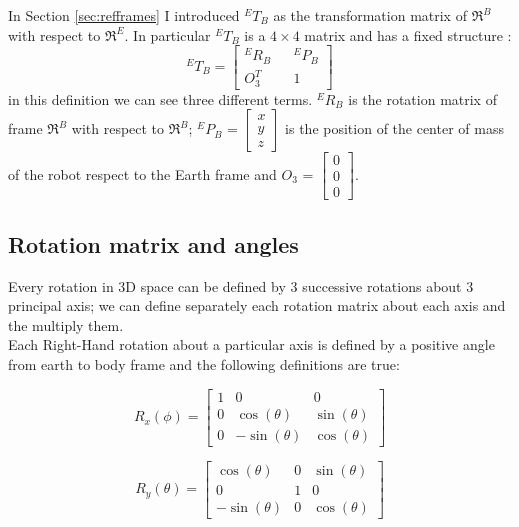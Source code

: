 \noindent
In Section \ref{sec:refframes} I introduced ${}^ET_B$ as the transformation matrix of $\Re^B$ with respect to $\Re^E$. In particular ${}^ET_B$ is a $4\times4$ matrix and has a fixed structure \cite{Khalil2004}: \begin{equation}
{}^ET_B = \begin{bmatrix}
{}^ER_B&&{}^EP_B\\
O_3^T&&1
\end{bmatrix}
\label{eq:transdef}
\end{equation}
in this definition we can see three different terms. ${}^ER_B$ is the rotation matrix of frame $\Re^B$ with respect to $\Re^B$; ${}^EP_B$ = $\begin{bmatrix}x\\y\\z\end{bmatrix}$ is the position of the center of mass of the robot respect to the Earth frame and $O_3$ = $\begin{bmatrix}0\\0\\0\end{bmatrix}$. 

\subsection*{Rotation matrix and angles}

Every rotation in 3D space can be defined by 3 successive rotations about 3 principal axis; we can define separately each rotation matrix about each axis and the multiply them.\\ 

\noindent
Each Right-Hand rotation about a particular axis is defined by a positive angle \cite{Blanco2010} from earth to body frame and the following definitions are true:

\begin{equation}
R_x(\phi) = \begin{bmatrix} 1 & 0            & 0 \\
							  0 & \cos(\theta) & \sin(\theta)\\
                              0 & -\sin(\theta) &  \cos(\theta) 
\end{bmatrix}
\end{equation}

\begin{equation}
R_y(\theta) = \begin{bmatrix} \cos(\theta)  & 0 & \sin(\theta) \\
							  0 & 		      1 &   0\\
                              -\sin(\theta) &  0 &  \cos(\theta) 
\end{bmatrix}
\end{equation}

